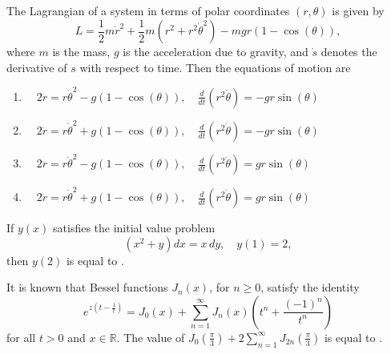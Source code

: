     \bigskip

    \item The Lagrangian of a system in terms of polar coordinates $(r, \theta)$ is given by
    \[
    L = \frac{1}{2} m \dot{r}^2 + \frac{1}{2} m \left( r^2 + r^2 \dot{\theta}^2 \right) - m g r \left( 1 - \cos(\theta) \right),
    \]
    where $m$ is the mass, $g$ is the acceleration due to gravity, and $\dot{s}$ denotes the derivative of $s$ with respect to time. Then the equations of motion are
    \begin{enumerate}
        \item $ \quad 2 \ddot{r} = r \dot{\theta}^2 - g \left( 1 - \cos(\theta) \right), \quad \frac{d}{dt} \left( r^2 \dot{\theta} \right) = - g r \sin(\theta)$
        \item $ \quad 2 \ddot{r} = r \dot{\theta}^2 + g \left( 1 - \cos(\theta) \right), \quad \frac{d}{dt} \left( r^2 \dot{\theta} \right) = - g r \sin(\theta)$
        \item $ \quad 2 \ddot{r} = r \dot{\theta}^2 - g \left( 1 - \cos(\theta) \right), \quad \frac{d}{dt} \left( r^2 \dot{\theta} \right) = g r \sin(\theta)$
        \item $ \quad 2 \ddot{r} = r \dot{\theta}^2 + g \left( 1 - \cos(\theta) \right), \quad \frac{d}{dt} \left( r^2 \dot{\theta} \right) = g r \sin(\theta)$
    \end{enumerate}

    \bigskip

    \item If $y(x)$ satisfies the initial value problem 
    \[
    (x^2 + y) dx = x \, dy, \quad y(1) = 2,
    \]
    then $y(2)$ is equal to \underline{\hspace{1cm}}.
    
    \bigskip

    \item It is known that Bessel functions $J_n(x)$, for $n \geq 0$, satisfy the identity
    \[
    e^{z \left( t - \frac{1}{t} \right)} = J_0(x) + \sum_{n=1}^\infty J_n(x) \left( t^n + \frac{(-1)^n}{t^n} \right)
    \]
    for all $t > 0$ and $x \in \mathbb{R}$. The value of $J_0 \left( \frac{\pi}{3} \right) + 2 \sum_{n=1}^\infty J_{2n} \left( \frac{\pi}{3} \right)$ is equal to \underline{\hspace{1cm}}.
    
    \bigskip

